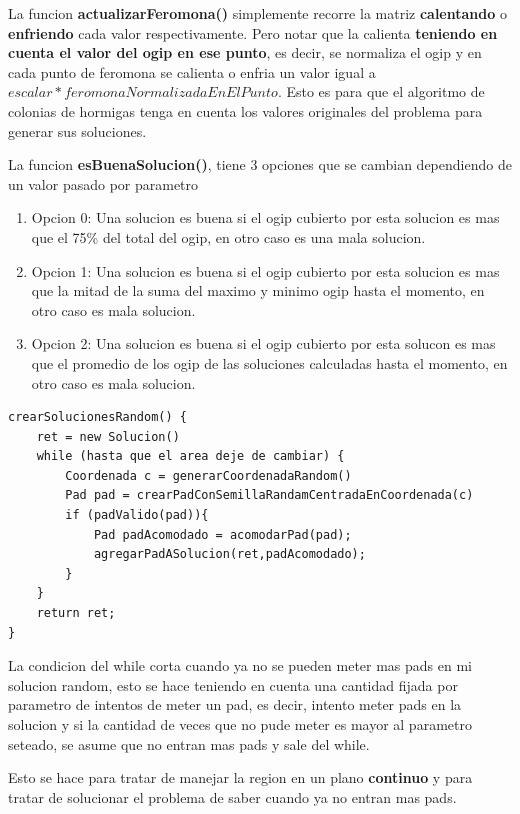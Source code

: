 La funcion \textbf{actualizarFeromona()} simplemente recorre la matriz \textbf{calentando} o \textbf{enfriendo} cada valor respectivamente. Pero notar que la calienta \textbf{teniendo en cuenta el valor del ogip en ese punto}, es decir, se normaliza el ogip y en cada punto de feromona se calienta o enfria un valor igual a $escalar * feromonaNormalizadaEnElPunto$. Esto es para que el algoritmo de colonias de hormigas tenga en cuenta los valores originales del problema para generar sus soluciones.


La funcion \textbf{esBuenaSolucion()}, tiene 3 opciones que se cambian dependiendo de un valor pasado por parametro

\begin{enumerate}
\item Opcion 0: Una solucion es buena si el ogip cubierto por esta solucion es mas que el 75\% del total del ogip, en otro caso es una mala solucion.
\item Opcion 1: Una solucion es buena si el ogip cubierto por esta solucion es mas que la mitad de la suma del maximo y minimo ogip hasta el momento, en otro caso es mala solucion.
\item Opcion 2: Una solucion es buena si el ogip cubierto por esta solucon es mas que el promedio de los ogip de las soluciones calculadas hasta el momento, en otro caso es mala solucion. 
\end{enumerate}



\begin{verbatim}	
crearSolucionesRandom() {
    ret = new Solucion()
    while (hasta que el area deje de cambiar) {
        Coordenada c = generarCoordenadaRandom()
        Pad pad = crearPadConSemillaRandamCentradaEnCoordenada(c)
        if (padValido(pad)){
            Pad padAcomodado = acomodarPad(pad);
            agregarPadASolucion(ret,padAcomodado);
        }
    }
    return ret;
}
\end{verbatim}	

La condicion del while corta cuando ya no se pueden meter mas pads en mi solucion random, esto se hace teniendo en cuenta una cantidad fijada por parametro de intentos de meter un pad, es decir, intento meter pads en la solucion y si la cantidad de veces que no pude meter es mayor al parametro seteado, se asume que no entran mas pads y sale del while. 

Esto se hace para tratar de manejar la region en un plano \textbf{continuo} y para tratar de solucionar el problema de saber cuando ya no entran mas pads.

